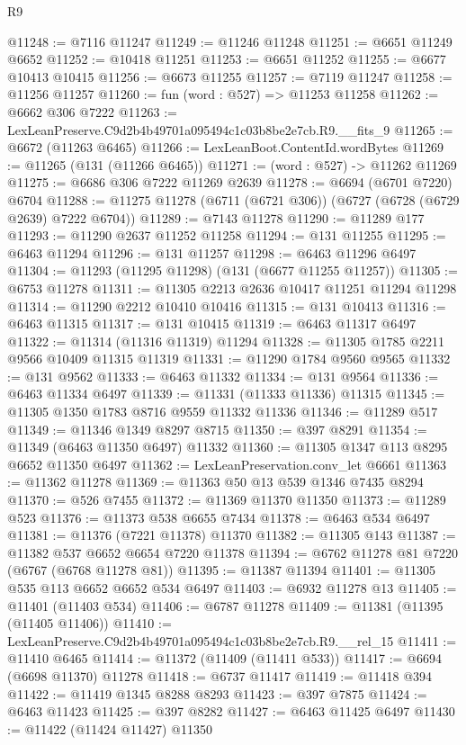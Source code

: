 \begin{lexlean}{R9}
\begin{coremodule}
@11248 := @7116 @11247
@11249 := @11246 @11248
@11251 := @6651 @11249 @6652
@11252 := @10418 @11251
@11253 := @6651 @11252
@11255 := @6677 @10413 @10415
@11256 := @6673 @11255
@11257 := @7119 @11247
@11258 := @11256 @11257
@11260 := fun (word : @527) => @11253 @11258
@11262 := @6662 @306 @7222
@11263 := LexLeanPreserve.C9d2b4b49701a095494c1c03b8be2e7cb.R9.__fits_9
@11265 := @6672 (@11263 @6465)
@11266 := LexLeanBoot.ContentId.wordBytes
@11269 := @11265 (@131 (@11266 @6465))
@11271 := (word : @527) -> @11262 @11269
@11275 := @6686 @306 @7222 @11269 @2639
@11278 := @6694 (@6701 @7220) @6704
@11288 := @11275 @11278 (@6711 (@6721 @306)) (@6727 (@6728 (@6729 @2639) @7222 @6704))
@11289 := @7143 @11278
@11290 := @11289 @177
@11293 := @11290 @2637 @11252 @11258
@11294 := @131 @11255
@11295 := @6463 @11294
@11296 := @131 @11257
@11298 := @6463 @11296 @6497
@11304 := @11293 (@11295 @11298) (@131 (@6677 @11255 @11257))
@11305 := @6753 @11278
@11311 := @11305 @2213 @2636 @10417 @11251 @11294 @11298
@11314 := @11290 @2212 @10410 @10416
@11315 := @131 @10413
@11316 := @6463 @11315
@11317 := @131 @10415
@11319 := @6463 @11317 @6497
@11322 := @11314 (@11316 @11319) @11294
@11328 := @11305 @1785 @2211 @9566 @10409 @11315 @11319
@11331 := @11290 @1784 @9560 @9565
@11332 := @131 @9562
@11333 := @6463 @11332
@11334 := @131 @9564
@11336 := @6463 @11334 @6497
@11339 := @11331 (@11333 @11336) @11315
@11345 := @11305 @1350 @1783 @8716 @9559 @11332 @11336
@11346 := @11289 @517
@11349 := @11346 @1349 @8297 @8715
@11350 := @397 @8291
@11354 := @11349 (@6463 @11350 @6497) @11332
@11360 := @11305 @1347 @113 @8295 @6652 @11350 @6497
@11362 := LexLeanPreservation.conv_let @6661
@11363 := @11362 @11278
@11369 := @11363 @50 @13 @539 @1346 @7435 @8294
@11370 := @526 @7455
@11372 := @11369 @11370 @11350
@11373 := @11289 @523
@11376 := @11373 @538 @6655 @7434
@11378 := @6463 @534 @6497
@11381 := @11376 (@7221 @11378) @11370
@11382 := @11305 @143
@11387 := @11382 @537 @6652 @6654 @7220 @11378
@11394 := @6762 @11278 @81 @7220 (@6767 (@6768 @11278 @81))
@11395 := @11387 @11394
@11401 := @11305 @535 @113 @6652 @6652 @534 @6497
@11403 := @6932 @11278 @13
@11405 := @11401 (@11403 @534)
@11406 := @6787 @11278
@11409 := @11381 (@11395 (@11405 @11406))
@11410 := LexLeanPreserve.C9d2b4b49701a095494c1c03b8be2e7cb.R9.__rel_15
@11411 := @11410 @6465
@11414 := @11372 (@11409 (@11411 @533))
@11417 := @6694 (@6698 @11370) @11278
@11418 := @6737 @11417
@11419 := @11418 @394
@11422 := @11419 @1345 @8288 @8293
@11423 := @397 @7875
@11424 := @6463 @11423
@11425 := @397 @8282
@11427 := @6463 @11425 @6497
@11430 := @11422 (@11424 @11427) @11350

\end{coremodule}
\end{lexlean}
